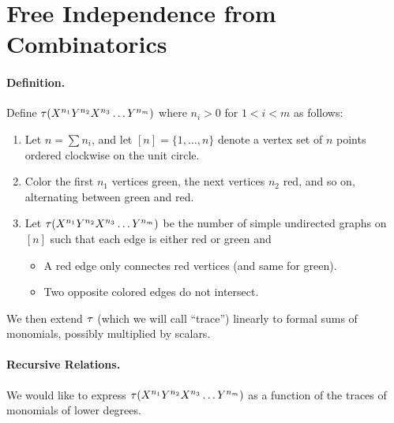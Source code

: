 \section{Free Independence from Combinatorics}
\paragraph{Definition.} Define $\tau(X^{n_1}Y^{n_2}X^{n_3}\dots Y^{n_m})$ where $n_i > 0$ for $1 < i < m$ as follows:
\begin{enumerate}
    \item Let $n = \sum n_i$, and let $[n] = \{1, \dots, n\}$ denote a vertex set of $n$ points ordered clockwise on the unit circle.
    \item Color the first $n_1$ vertices green, the next vertices $n_2$ red, and so on, alternating between green and red.
    \item Let $\tau(X^{n_1}Y^{n_2}X^{n_3}\dots Y^{n_m})$ be the number of simple undirected graphs on $[n]$ such that each edge is either red or green and
    \begin{itemize}
        \item A red edge only connectes red vertices (and same for green).
        \item Two opposite colored edges do not intersect.
    \end{itemize}
\end{enumerate}
We then extend $\tau$ (which we will call ``trace'') linearly to formal sums of monomials, possibly multiplied by scalars.

\paragraph{Recursive Relations.} We would like to express $\tau(X^{n_1}Y^{n_2}X^{n_3}\dots Y^{n_m})$ as a function of the traces of monomials of lower degrees.

